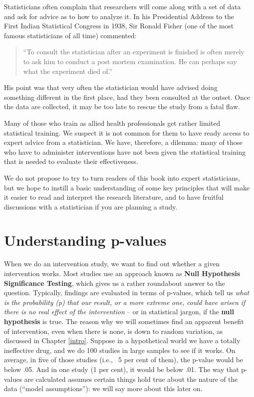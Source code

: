 \documentclass{krantz}
\begin{document}
Statisticians often complain that researchers will come along with a set of data and ask for advice as to how to analyze it. In his Presidential Address to the First Indian Statistical Congress in 1938, Sir Ronald Fisher (one of the most famous statisticians of all time) commented:

\begin{quote}
``To consult the statistician after an experiment is finished is often merely to ask him to conduct a post mortem examination. He can perhaps say what the experiment died of.''
\end{quote}

His point was that very often the statistician would have advised doing something different in the first place, had they been consulted at the outset. Once the data are collected, it may be too late to rescue the study from a fatal flaw.

Many of those who train as allied health professionals get rather limited statistical training. We suspect it is not common for them to have ready access to expert advice from a statistician. We have, therefore, a dilemma: many of those who have to administer interventions have not been given the statistical training that is needed to evaluate their effectiveness.

We do not propose to try to turn readers of this book into expert statisticians, but we hope to instill a basic understanding of some key principles that will make it easier to read and interpret the research literature, and to have fruitful discussions with a statistician if you are planning a study.

\hypertarget{understanding-p-values}{%
\section{Understanding p-values}\label{understanding-p-values}}

When we do an intervention study, we want to find out whether a given intervention works. Most studies use an approach known as \textbf{Null Hypothesis Significance Testing}, which gives us a rather roundabout answer to the question. Typically, findings are evaluated in terms of p-values, which tell us \emph{what is the probability (p) that our result, or a more extreme one, could have arisen if there is no real effect of the intervention} -- or in statistical jargon, if the \textbf{null hypothesis} is true. The reason why we will sometimes find an apparent benefit of intervention, even when there is none, is down to random variation, as discussed in Chapter \ref{intro}. Suppose in a hypothetical world we have a totally ineffective drug, and we do 100 studies in large samples to see if it works. On average, in five of those studies (i.e., ~5 per cent of them), the p-value would be below .05. And in one study (1 per cent), it would be below .01. The way that p-values are calculated assumes certain things hold true about the nature of the data (``model assumptions''): we will say more about this later on.
\end{document}
